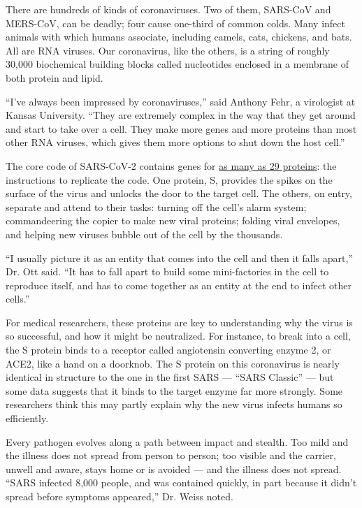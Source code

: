 There are hundreds of kinds of coronaviruses. Two of them, SARS-CoV and
MERS-CoV, can be deadly; four cause one-third of common colds. Many
infect animals with which humans associate, including camels, cats,
chickens, and bats. All are RNA viruses. Our coronavirus, like the
others, is a string of roughly 30,000 biochemical building blocks called
nucleotides enclosed in a membrane of both protein and lipid.

``I've always been impressed by coronaviruses,'' said Anthony Fehr, a
virologist at Kansas University. ``They are extremely complex in the way
that they get around and start to take over a cell. They make more genes
and more proteins than most other RNA viruses, which gives them more
options to shut down the host cell.''

The core code of SARS-CoV-2 contains genes for
\href{https://www.nytimes.com/interactive/2020/04/03/science/coronavirus-genome-bad-news-wrapped-in-protein.html?searchResultPosition=1}{as
many as 29 proteins}: the instructions to replicate the code. One
protein, S, provides the spikes on the surface of the virus and unlocks
the door to the target cell. The others, on entry, separate and attend
to their tasks: turning off the cell's alarm system; commandeering the
copier to make new viral proteins; folding viral envelopes, and helping
new viruses bubble out of the cell by the thousands.

``I usually picture it as an entity that comes into the cell and then it
falls apart,'' Dr. Ott said. ``It has to fall apart to build some
mini-factories in the cell to reproduce itself, and has to come together
as an entity at the end to infect other cells.''

For medical researchers, these proteins are key to understanding why the
virus is so successful, and how it might be neutralized. For instance,
to break into a cell, the S protein binds to a receptor called
angiotensin converting enzyme 2, or ACE2, like a hand on a doorknob. The
S protein on this coronavirus is nearly identical in structure to the
one in the first SARS --- ``SARS Classic'' --- but some data suggests
that it binds to the target enzyme far more strongly. Some researchers
think this may partly explain why the new virus infects humans so
efficiently.

Every pathogen evolves along a path between impact and stealth. Too mild
and the illness does not spread from person to person; too visible and
the carrier, unwell and aware, stays home or is avoided --- and the
illness does not spread. ``SARS infected 8,000 people, and was contained
quickly, in part because it didn't spread before symptoms appeared,''
Dr. Weiss noted.

